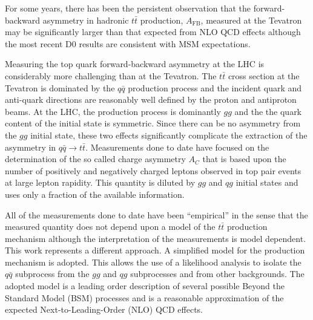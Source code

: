 \documentclass{cmspaperpdf}
\begin{document}
For some years, there has been the persistent observation that the forward-backward asymmetry in hadronic $t\bar t$ production, $A_\mathrm{FB}$, measured at the Tevatron \cite{cdf,d0} may be significantly larger than that expected from NLO QCD effects \cite{Kuhn:1998kw, Kuhn:2011ri, AguilarSaavedra:2012rx} although the most recent D0 results \cite{Abazov:2014cca} are consistent with MSM expectations.

Measuring the top quark forward-backward asymmetry at the LHC is considerably more challenging than at the Tevatron.  The $t\bar t$ cross section at the Tevatron is dominated by the $q\bar q$ production process and the incident quark and anti-quark directions are reasonably well defined by the proton and antiproton beams.  At the LHC, the production process is dominantly $gg$ and the the quark content of the initial state is symmetric.  Since there can be no asymmetry from the $gg$ initial state, these two effects significantly complicate the extraction of the asymmetry in $q\bar q\to t\bar t$.  Measurements \cite{ATLAS_measurement,CMS_measurement,Chatrchyan:2014yta} done to date have focused on the determination of the so called charge asymmetry $A_C$ that is based upon the number of positively and negatively charged leptons observed in top pair events at large lepton rapidity. This quantity is diluted by $gg$ and $qg$ initial states and uses only a fraction of the available information. 

All of the measurements done to date have been ``empirical'' in the sense that the measured quantity does not depend upon a model of the $t\bar t$ production mechanism although the interpretation of the measurements is model dependent.  This work represents a different approach.  A simplified model for the production mechanism is adopted.  This allows the use of a likelihood analysis to isolate the $q\bar q$ subprocess from the $gg$  and $qg$ subprocesses and from other backgrounds.  The adopted model is a leading order description of several possible Beyond the Standard Model (BSM) processes and is a reasonable approximation of the expected Next-to-Leading-Order (NLO) QCD effects.
\end{document}
